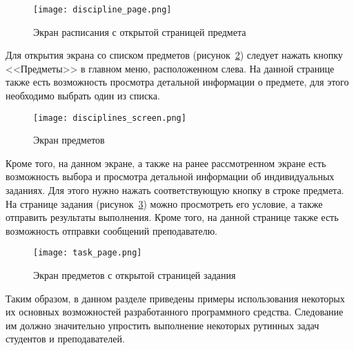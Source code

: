 \begin{figure}[ht]
\centering
	\texttt{[image: discipline\_page.png]}
	\caption{Экран расписания с открытой страницей предмета}
	\label{fig:manual:discipline_page}
\end{figure}

Для открытия экрана со списком предметов (рисунок~\ref{fig:manual:disciplines_screen}) следует нажать кнопку <<Предметы>> в главном меню, расположенном слева. На данной странице также есть возможность просмотра детальной информации о предмете, для этого необходимо выбрать один из списка.

\begin{figure}[ht!]
\centering
	\texttt{[image: disciplines\_screen.png]}
	\caption{Экран предметов}
	\label{fig:manual:disciplines_screen}
\end{figure}

Кроме того, на данном экране, а также на ранее рассмотренном экране есть возможность выбора и просмотра детальной информации об индивидуальных заданиях. Для этого нужно нажать соответствующую кнопку в строке предмета. На странице задания (рисунок~\ref{fig:manual:task_page}) можно просмотреть его условие, а также отправить результаты выполнения. Кроме того, на данной странице также есть возможность отправки сообщений преподавателю.

\begin{figure}[ht!]
\centering
	\texttt{[image: task\_page.png]}
	\caption{Экран предметов с открытой страницей задания}
	\label{fig:manual:task_page}
\end{figure}

Таким образом, в данном разделе приведены примеры использования некоторых их основных возможностей разработанного программного средства. Следование им должно значительно упростить выполнение некоторых рутинных задач студентов и преподавателей.

